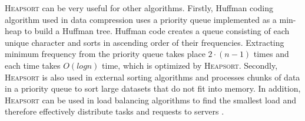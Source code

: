 \documentclass[12pt]{article}
\begin{document}
\textsc{Heapsort} can be very useful for other algorithms. Firstly, Huffman coding algorithm used in data compression uses a priority queue implemented as a min-heap to build a Huffman tree. Huffman code creates a queue consisting of each unique character and sorts in ascending order of their frequencies. Extracting minimum frequency from the priority queue takes place $2 \cdot (n-1)$ times and each time takes $O(logn)$ time, which is optimized by \textsc{Heapsort}\cite{huffman}. Secondly, \textsc{Heapsort} is also used in external sorting algorithms and processes chunks of data in a priority queue to sort large datasets that do not fit into memory. In addition, \textsc{Heapsort} can be used in load balancing algorithms to find the smallest load and therefore effectively distribute tasks and requests to servers \cite{geeks}. 





\clearpage


\end{document}
